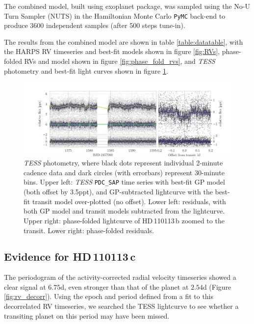 \documentclass[fleqn,usenatbib]{mnras}
\newcommand{\tess}{{\it TESS}}
\newcommand{\harps}{{HARPS}}
\newcommand{\Tplanet}{HD\,110113\,b}
\newcommand{\Tplanetc}{HD\,110113\,c}
\begin{document}
The combined model, built using \textsf{exoplanet} \citep{exoplanet} package, was sampled using the No-U Turn Sampler (NUTS) in the Hamiltonian Monte Carlo \texttt{PyMC} back-end \citep{exoplanet:pymc3} to produce 3600 independent samples (after 500 steps tune-in).

The results from the combined model are shown in table \ref{table:datatable}, with the \harps{} RV timeseries and best-fit models shown in figure \ref{fig:RVs}, phase-folded RVs and model shown in figure \ref{fig:phase_fold_rvs}, and \tess{} photometry and best-fit light curves shown in figure \ref{fig:photometry}.

\begin{figure}
	\includegraphics[width=\textwidth, trim={1.45cm 0.2 0.95cm 0.5}]{Combined_phot_plot_3_GPs_nontransiting_c.pdf}
    \caption{\tess{} photometry, where black dots represent individual 2-minute cadence data and dark circles (with errorbars) represent 30-minute bins. Upper left: \tess{} \texttt{PDC\_SAP} time series with best-fit GP model (both offset by 3.5ppt), and GP-subtracted lightcurve with the best-fit transit model over-plotted (no offset). Lower left: residuals, with both GP model and transit models subtracted from the lightcurve. Upper right: phase-folded lightcurve of \Tplanet{} zoomed to the transit. Lower right: phase-folded residuals. }
    \label{fig:photometry}
\end{figure}

\subsection{Evidence for \Tplanetc{}}
The periodogram of the activity-corrected radial velocity timeseries showed a clear signal at $6.75$d, even stronger than that of the planet at $2.54$d (Figure \ref{fig:rv_decorr}).
Using the epoch and period defined from a fit to this decorrelated RV timeseries, we searched the TESS lightcurve to see whether a transiting planet on this period may have been missed.
\end{document}
